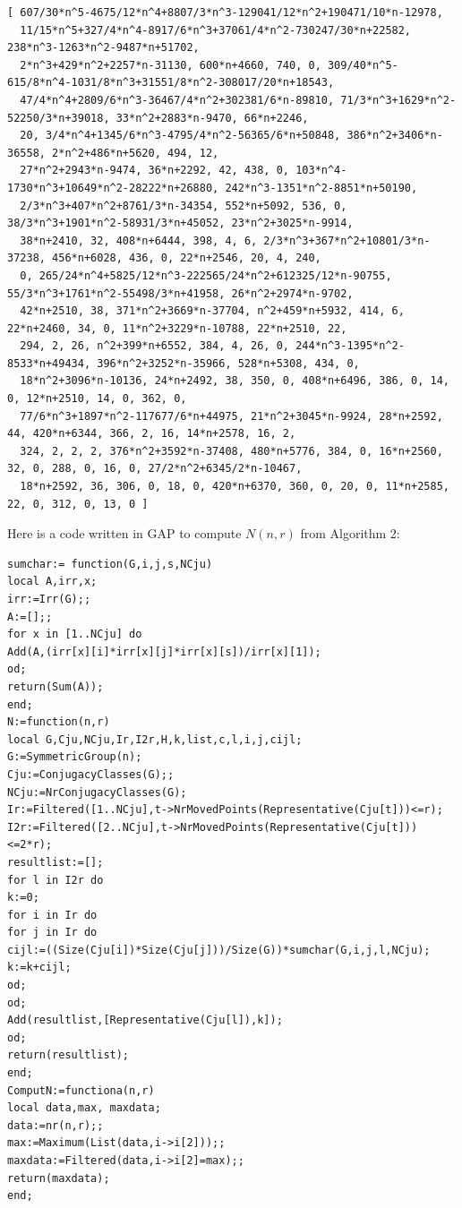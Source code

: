 \documentclass{amsart}
\numberwithin{equation}{section}
\begin{document}
\begin{lstlisting}
[ 607/30*n^5-4675/12*n^4+8807/3*n^3-129041/12*n^2+190471/10*n-12978, 
  11/15*n^5+327/4*n^4-8917/6*n^3+37061/4*n^2-730247/30*n+22582, 238*n^3-1263*n^2-9487*n+51702, 
  2*n^3+429*n^2+2257*n-31130, 600*n+4660, 740, 0, 309/40*n^5-615/8*n^4-1031/8*n^3+31551/8*n^2-308017/20*n+18543, 
  47/4*n^4+2809/6*n^3-36467/4*n^2+302381/6*n-89810, 71/3*n^3+1629*n^2-52250/3*n+39018, 33*n^2+2883*n-9470, 66*n+2246, 
  20, 3/4*n^4+1345/6*n^3-4795/4*n^2-56365/6*n+50848, 386*n^2+3406*n-36558, 2*n^2+486*n+5620, 494, 12, 
  27*n^2+2943*n-9474, 36*n+2292, 42, 438, 0, 103*n^4-1730*n^3+10649*n^2-28222*n+26880, 242*n^3-1351*n^2-8851*n+50190, 
  2/3*n^3+407*n^2+8761/3*n-34354, 552*n+5092, 536, 0, 38/3*n^3+1901*n^2-58931/3*n+45052, 23*n^2+3025*n-9914, 
  38*n+2410, 32, 408*n+6444, 398, 4, 6, 2/3*n^3+367*n^2+10801/3*n-37238, 456*n+6028, 436, 0, 22*n+2546, 20, 4, 240, 
  0, 265/24*n^4+5825/12*n^3-222565/24*n^2+612325/12*n-90755, 55/3*n^3+1761*n^2-55498/3*n+41958, 26*n^2+2974*n-9702, 
  42*n+2510, 38, 371*n^2+3669*n-37704, n^2+459*n+5932, 414, 6, 22*n+2460, 34, 0, 11*n^2+3229*n-10788, 22*n+2510, 22, 
  294, 2, 26, n^2+399*n+6552, 384, 4, 26, 0, 244*n^3-1395*n^2-8533*n+49434, 396*n^2+3252*n-35966, 528*n+5308, 434, 0, 
  18*n^2+3096*n-10136, 24*n+2492, 38, 350, 0, 408*n+6496, 386, 0, 14, 0, 12*n+2510, 14, 0, 362, 0, 
  77/6*n^3+1897*n^2-117677/6*n+44975, 21*n^2+3045*n-9924, 28*n+2592, 44, 420*n+6344, 366, 2, 16, 14*n+2578, 16, 2, 
  324, 2, 2, 2, 376*n^2+3592*n-37408, 480*n+5776, 384, 0, 16*n+2560, 32, 0, 288, 0, 16, 0, 27/2*n^2+6345/2*n-10467, 
  18*n+2592, 36, 306, 0, 18, 0, 420*n+6370, 360, 0, 20, 0, 11*n+2585, 22, 0, 312, 0, 13, 0 ]
\end{lstlisting}


Here is a code written in \textsf{GAP} \cite{GAP} to compute $N(n,r)$ from Algorithm 2:
{\scriptsize
 \begin{verbatim}
sumchar:= function(G,i,j,s,NCju)
local A,irr,x;
irr:=Irr(G);;
A:=[];;
for x in [1..NCju] do
Add(A,(irr[x][i]*irr[x][j]*irr[x][s])/irr[x][1]);
od;
return(Sum(A)); 
end;
N:=function(n,r)
local G,Cju,NCju,Ir,I2r,H,k,list,c,l,i,j,cijl;
G:=SymmetricGroup(n);
Cju:=ConjugacyClasses(G);;
NCju:=NrConjugacyClasses(G);
Ir:=Filtered([1..NCju],t->NrMovedPoints(Representative(Cju[t]))<=r);
I2r:=Filtered([2..NCju],t->NrMovedPoints(Representative(Cju[t]))<=2*r);
resultlist:=[];
for l in I2r do
k:=0;
for i in Ir do
for j in Ir do
cijl:=((Size(Cju[i])*Size(Cju[j]))/Size(G))*sumchar(G,i,j,l,NCju);
k:=k+cijl;
od;
od;
Add(resultlist,[Representative(Cju[l]),k]);
od;
return(resultlist);
end;
ComputN:=functiona(n,r)
local data,max, maxdata;
data:=nr(n,r);;
max:=Maximum(List(data,i->i[2]));;
maxdata:=Filtered(data,i->i[2]=max);;
return(maxdata);
end;

\end{verbatim}}
\end{document}
